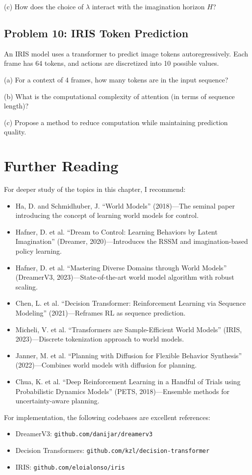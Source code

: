 (c) How does the choice of $\lambda$ interact with the imagination horizon $H$?

\subsection{Problem 10: IRIS Token Prediction}

An IRIS model uses a transformer to predict image tokens autoregressively. Each frame has 64 tokens, and actions are discretized into 10 possible values.

(a) For a context of 4 frames, how many tokens are in the input sequence?

(b) What is the computational complexity of attention (in terms of sequence length)?

(c) Propose a method to reduce computation while maintaining prediction quality.

\section{Further Reading}

For deeper study of the topics in this chapter, I recommend:

\begin{itemize}
    \item Ha, D. and Schmidhuber, J. ``World Models'' (2018)---The seminal paper introducing the concept of learning world models for control.

    \item Hafner, D. et al. ``Dream to Control: Learning Behaviors by Latent Imagination'' (Dreamer, 2020)---Introduces the RSSM and imagination-based policy learning.

    \item Hafner, D. et al. ``Mastering Diverse Domains through World Models'' (DreamerV3, 2023)---State-of-the-art world model algorithm with robust scaling.

    \item Chen, L. et al. ``Decision Transformer: Reinforcement Learning via Sequence Modeling'' (2021)---Reframes RL as sequence prediction.

    \item Micheli, V. et al. ``Transformers are Sample-Efficient World Models'' (IRIS, 2023)---Discrete tokenization approach to world models.

    \item Janner, M. et al. ``Planning with Diffusion for Flexible Behavior Synthesis'' (2022)---Combines world models with diffusion for planning.

    \item Chua, K. et al. ``Deep Reinforcement Learning in a Handful of Trials using Probabilistic Dynamics Models'' (PETS, 2018)---Ensemble methods for uncertainty-aware planning.
\end{itemize}

For implementation, the following codebases are excellent references:
\begin{itemize}
    \item DreamerV3: \texttt{github.com/danijar/dreamerv3}
    \item Decision Transformers: \texttt{github.com/kzl/decision-transformer}
    \item IRIS: \texttt{github.com/eloialonso/iris}
\end{itemize}

